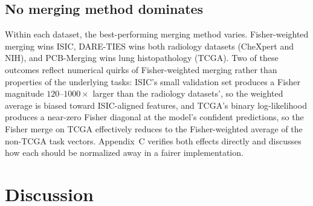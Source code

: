 \documentclass{article}
\begin{document}
\subsection{No merging method dominates}
\label{sec:method-ranking}

Within each dataset, the best-performing merging method varies. Fisher-weighted merging wins ISIC, DARE-TIES wins both radiology datasets (CheXpert and NIH), and PCB-Merging wins lung histopathology (TCGA). Two of these outcomes reflect numerical quirks of Fisher-weighted merging rather than properties of the underlying tasks: ISIC's small validation set produces a Fisher magnitude $120$--$1000\times$ larger than the radiology datasets', so the weighted average is biased toward ISIC-aligned features, and TCGA's binary log-likelihood produces a near-zero Fisher diagonal at the model's confident predictions, so the Fisher merge on TCGA effectively reduces to the Fisher-weighted average of the non-TCGA task vectors. Appendix~C verifies both effects directly and discusses how each should be normalized away in a fairer implementation.



\section{Discussion}
\end{document}
